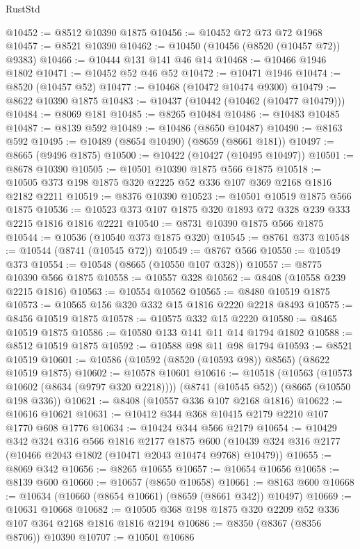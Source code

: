 \begin{lexlean}{RustStd}
\begin{coremodule}
{\begin{coremodule}
{{{{{{{{{{{{{{{{{{{{{{{{{{{{{{{{{{{{{{{{{{{{{{{@10452 := @8512 @10390 @1875
@10456 := @10452 @72 @73 @72 @1968
@10457 := @8521 @10390
@10462 := @10450 (@10456 (@8520 (@10457 @72)) @9383)
@10466 := @10444 @131 @141 @46 @14
@10468 := @10466 @1946 @1802
@10471 := @10452 @52 @46 @52
@10472 := @10471 @1946
@10474 := @8520 (@10457 @52)
@10477 := @10468 (@10472 @10474 @9300)
@10479 := @8622 @10390 @1875
@10483 := @10437 (@10442 (@10462 (@10477 @10479)))
@10484 := @8069 @181
@10485 := @8265 @10484
@10486 := @10483 @10485
@10487 := @8139 @592
@10489 := @10486 (@8650 @10487)
@10490 := @8163 @592
@10495 := @10489 (@8654 @10490) (@8659 (@8661 @181))
@10497 := @8665 (@9496 @1875)
@10500 := @10422 (@10427 (@10495 @10497))
@10501 := @8678 @10390
@10505 := @10501 @10390 @1875 @566 @1875
@10518 := @10505 @373 @198 @1875 @320 @2225 @52 @336 @107 @369 @2168 @1816 @2182 @2211
@10519 := @8376 @10390
@10523 := @10501 @10519 @1875 @566 @1875
@10536 := @10523 @373 @107 @1875 @320 @1893 @72 @328 @239 @333 @2215 @1816 @1816 @2221
@10540 := @8731 @10390 @1875 @566 @1875
@10544 := @10536 (@10540 @373 @1875 @320)
@10545 := @8761 @373
@10548 := @10544 (@8741 (@10545 @72))
@10549 := @8767 @566
@10550 := @10549 @373
@10554 := @10548 (@8665 (@10550 @107 @328))
@10557 := @8775 @10390 @566 @1875
@10558 := @10557 @328
@10562 := @8408 (@10558 @239 @2215 @1816)
@10563 := @10554 @10562
@10565 := @8480 @10519 @1875
@10573 := @10565 @156 @320 @332 @15 @1816 @2220 @2218 @8493
@10575 := @8456 @10519 @1875
@10578 := @10575 @332 @15 @2220
@10580 := @8465 @10519 @1875
@10586 := @10580 @133 @141 @11 @14 @1794 @1802
@10588 := @8512 @10519 @1875
@10592 := @10588 @98 @11 @98 @1794
@10593 := @8521 @10519
@10601 := @10586 (@10592 (@8520 (@10593 @98)) @8565) (@8622 @10519 @1875)
@10602 := @10578 @10601
@10616 := @10518
    (@10563 (@10573 @10602 (@8634 (@9797 @320 @2218))))
    (@8741 (@10545 @52))
    (@8665 (@10550 @198 @336))
@10621 := @8408 (@10557 @336 @107 @2168 @1816)
@10622 := @10616 @10621
@10631 := @10412 @344 @368 @10415 @2179 @2210 @107 @1770 @608 @1776
@10634 := @10424 @344 @566 @2179
@10654 := @10429
    @342
    @324
    @316
    @566
    @1816
    @2177
    @1875
    @600
    (@10439 @324 @316 @2177 (@10466 @2043 @1802 (@10471 @2043 @10474 @9768) @10479))
@10655 := @8069 @342
@10656 := @8265 @10655
@10657 := @10654 @10656
@10658 := @8139 @600
@10660 := @10657 (@8650 @10658)
@10661 := @8163 @600
@10668 := @10634 (@10660 (@8654 @10661) (@8659 (@8661 @342)) @10497)
@10669 := @10631 @10668
@10682 := @10505 @368 @198 @1875 @320 @2209 @52 @336 @107 @364 @2168 @1816 @1816 @2194
@10686 := @8350 (@8367 (@8356 @8706)) @10390
@10707 := @10501
    @10686
}}}}}}}}}}}}}}}}}}}}}}}}}}}}}}}}}}}}}}}}}}}}}}}
\end{coremodule}}
\end{coremodule}
\end{lexlean}
